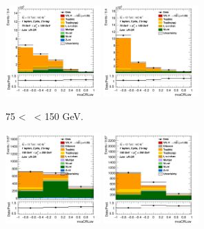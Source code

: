 \begin{figure}[h!]
    \centering
    \begin{subfigure}[b]{\textwidth}
        \centering
        \includegraphics[width=0.40\textwidth]{Images/VH/Own_fit/prefit_VHbb/Region_distmvaCRLow_BMax150_BMin75_DCRLow_J2_TTypebb_T2_L1_Y6051_Prefit.png}
        \includegraphics[width=0.40\textwidth]{Images/VH/Own_fit/prefit_VHbb/Region_distmvaCRLow_BMax150_BMin75_DCRLow_J3_TTypebb_T2_L1_Y6051_Prefit.png}
        \caption{75 < \ptv\ < 150 GeV.}
        \label{fig:plots_VHbb_1L_75_CRL}
    \end{subfigure}
    \begin{subfigure}[b]{\textwidth}
        \centering
        \includegraphics[width=0.40\textwidth]{Images/VH/Own_fit/prefit_VHbb/Region_distmvaCRLow_BMax250_BMin150_DCRLow_J2_TTypebb_T2_L1_Y6051_Prefit.png}
        \includegraphics[width=0.40\textwidth]{Images/VH/Own_fit/prefit_VHbb/Region_distmvaCRLow_BMax250_BMin150_DCRLow_J3_TTypebb_T2_L1_Y6051_Prefit.png}

\end{subfigure}
\end{figure}
